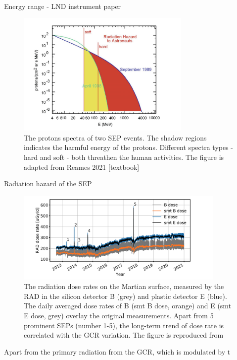 Energy range - LND instrument paper

\begin{figure}
	\centering
	\includegraphics[width = 0.75\textwidth]{images/SEP-radiation_hazard.png}
	\caption{The protons spectra of two SEP events. The shadow regions indicates the harmful energy of the protons. Different spectra types - hard and soft - both threathen the human activities. The figure is adapted from Reames 2021 [textbook]}
	\label{Fig:SEP-radiation_hazard}
\end{figure}
Radiation hazard of the SEP 


\begin{figure}
	\centering
	\includegraphics[width = 0.9\textwidth]{images/Rad_GCR_radiation.png}

	\caption{The radiation dose rates on the Martian surface, measured by the \ac{RAD} in the silicon detector B (grey) and plastic detector E (blue). The daily averaged dose rates of B (smt B dose, orange) and E (smt E dose, grey) overlay the original measurements. Apart from 5 prominent SEPs (number 1-5), the long-term trend of dose rate is correlated with the \ac{GCR} variation. The figure is reproduced from \citep{Guo2021AARv_rad}}
	\label{Fig:Rad_GCR_radiation}
\end{figure}
	
Apart from the primary radiation from the GCR, which is modulated by t

